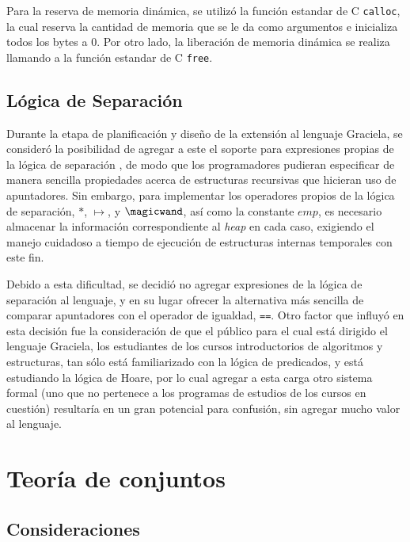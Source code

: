 {{Para la reserva de memoria dinámica, se utilizó la función estandar de C
\texttt{calloc}, la cual reserva la cantidad de memoria que se le da como
argumentos e inicializa todos los bytes a 0. Por otro lado, la liberación de
memoria dinámica se realiza llamando a la función estandar de C \texttt{free}.

\subsection{Lógica de Separación}

Durante la etapa de planificación y diseño de la extensión al lenguaje Graciela,
se consideró la posibilidad de agregar a este el soporte para expresiones
propias de la lógica de separación , de modo
que los programadores pudieran especificar de manera sencilla propiedades acerca
de estructuras recursivas que hicieran uso de apuntadores. Sin embargo, para
implementar los operadores propios de la lógica de separación, $*$, $\mapsto$, y
$\magicwand$, así como la constante $emp$, es necesario almacenar la información
correspondiente al \textit{heap} en cada caso, exigiendo el manejo cuidadoso a
tiempo de ejecución de estructuras internas temporales con este fin.

Debido a esta dificultad, se decidió no agregar expresiones de la lógica de
separación al lenguaje, y en su lugar ofrecer la alternativa más sencilla de
comparar apuntadores con el operador de igualdad, \texttt{==}. Otro factor que
influyó en esta decisión fue la consideración de que el público para el cual
está dirigido el lenguaje Graciela, los estudiantes de los cursos introductorios
de algoritmos y estructuras, tan sólo está familiarizado con la lógica de
predicados, y está estudiando la lógica de Hoare, por lo cual agregar a esta
carga otro sistema formal  (uno que no pertenece a los programas de
estudios de los cursos en cuestión) resultaría en un gran potencial para
confusión, sin agregar mucho valor al lenguaje.

\section{Teoría de conjuntos}
\subsection{Consideraciones}

}}
